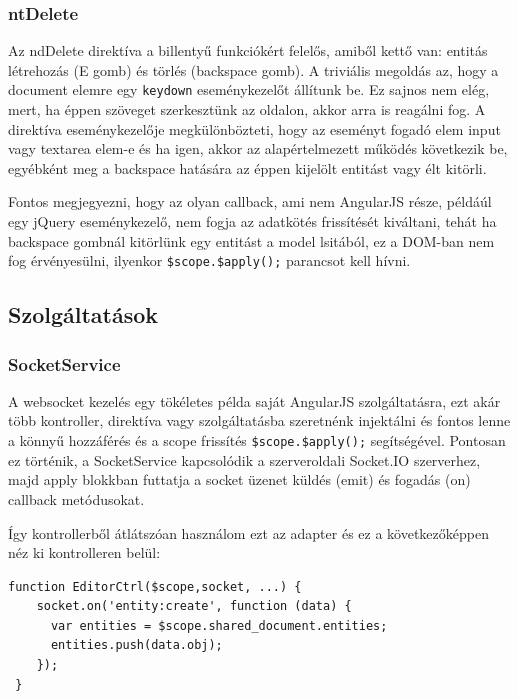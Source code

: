 \subsubsection{ntDelete}

Az ndDelete direktíva a billentyű funkciókért felelős, amiből kettő van: entitás létrehozás (E gomb) és törlés (backspace gomb). A triviális megoldás az, hogy a document elemre egy \lstinline{keydown} eseménykezelőt állítunk be. Ez sajnos nem elég, mert, ha éppen szöveget szerkesztünk az oldalon, akkor arra is reagálni fog. A direktíva eseménykezelője megkülönbözteti, hogy az eseményt fogadó elem input vagy textarea elem-e és ha igen, akkor az alapértelmezett működés következik be, egyébként meg a backspace hatására az éppen kijelölt entitást vagy élt kitörli.

Fontos megjegyezni, hogy az olyan callback, ami nem AngularJS része, példáúl egy jQuery eseménykezelő, nem fogja az adatkötés frissítését kiváltani, tehát ha backspace gombnál kitörlünk egy entitást a model lsitából, ez a DOM-ban nem fog érvényesülni, ilyenkor \lstinline{$scope.$apply();} parancsot kell hívni. 

\subsection{Szolgáltatások}

\subsubsection{SocketService}

A websocket kezelés egy tökéletes példa saját AngularJS szolgáltatásra, ezt akár több kontroller, direktíva vagy szolgáltatásba szeretnénk injektálni és fontos lenne a könnyű hozzáférés és a scope frissítés \lstinline{$scope.$apply();} segítségével. Pontosan ez történik, a SocketService kapcsolódik a szerveroldali Socket.IO szerverhez, majd apply blokkban futtatja a socket üzenet küldés (emit) és fogadás (on) callback metódusokat.

Így kontrollerből átlátszóan használom ezt az adapter és ez a következőképpen néz ki kontrolleren belül:

\begin{lstlisting}[caption=Függőséginjektálás kontrollerbe]
 function EditorCtrl($scope,socket, ...) {
    socket.on('entity:create', function (data) {
      var entities = $scope.shared_document.entities;
      entities.push(data.obj);
    });
 }
\end{lstlisting}

